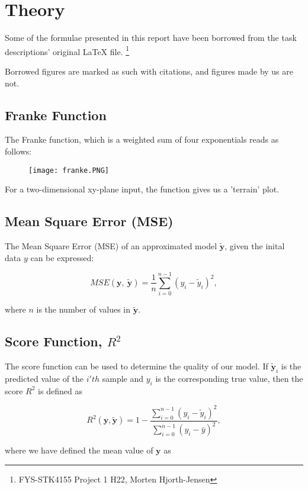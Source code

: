 \documentclass[reprint,english,notitlepage]{revtex4-1}  %
\begin{document}
\section{Theory}

Some of the formulae presented in this report have been borrowed from the task descriptions' original LaTeX file. \hfill \footnote{FYS-STK4155 Project 1 H22, Morten Hjorth-Jensen}

Borrowed figures are marked as such with citations, and figures made by us are not.

\subsection{Franke Function}

The Franke function, which is a weighted sum of four exponentials reads as
follows:

\begin{figure}[h!]
    \centering
    \texttt{[image: franke.PNG]}
\end{figure}

For a two-dimensional xy-plane input, the function gives us a 'terrain' plot.

\subsection{Mean Square Error (MSE)}

The Mean Square Error (MSE) of an approximated model $\tilde{\bm{y}}$, given the inital data ${y}$ can be expressed:

\[ MSE(\bm{y}, \ \tilde{\bm{y}}) = \frac{1}{n}
\sum_{i=0}^{n-1}(y_i-\tilde{y}_i)^2, 
\] 

where $n$ is the number of values in $\tilde{\bm{y}}$.\\

\subsection{Score Function, $R^2$}

The score function can be used to determine the quality of our model. If $\tilde{\bm{y}}_i$ is the predicted value of the $i'th$ sample and $y_i$ is the corresponding true value, then the score $R^2$ is defined as

\[
R^2(\bm{y}, \tilde{\bm{y}}) = 1 - \frac{\sum_{i=0}^{n - 1} (y_i - \tilde{y}_i)^2}{\sum_{i=0}^{n - 1} (y_i - \bar{y})^2},
\]

where we have defined the mean value  of $\bm{y}$ as
\end{document}
